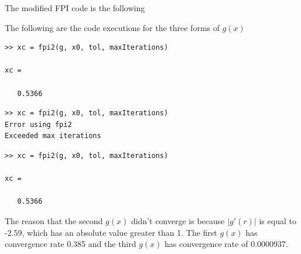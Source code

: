 \documentclass[10pt,letterpaper]{article}
\begin{document}
\color{TangGreen}
The modified FPI code is the following

The following are the code executions for the three forms of $g(x)$
\begin{lstlisting}[frame=single,caption={$g(x) = ((1 - x)  3)^{1/3}$},label=FPI1]
>> xc = fpi2(g, x0, tol, maxIterations)

xc =

   0.5366
\end{lstlisting}
\begin{lstlisting}[frame=single,caption={$g(x) = 1 - 3x^{3}$},label=FPI2]
>> xc = fpi2(g, x0, tol, maxIterations)
Error using fpi2
Exceeded max iterations
\end{lstlisting}
\begin{lstlisting}[frame=single,caption={$g(x) = (1 + 6x^{3}) / (1 + 9x^{2})$},label=FPI3]
>> xc = fpi2(g, x0, tol, maxIterations)

xc =

   0.5366
\end{lstlisting}
The reason that the second $g(x)$ didn't converge is because $|g'(r)|$ is equal to -2.59, which has an absolute value greater than 1. The first $g(x)$ has convergence rate 0.385 and the third $g(x)$ has convergence rate of 0.0000937. 
\color{black}
\end{document}
